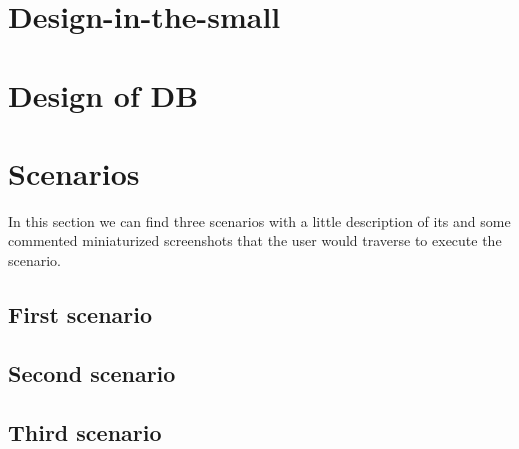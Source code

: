 \documentclass[12pt,a4paper]{article}
\begin{document}
\section{Design-in-the-small}
\section{Design of DB}
\section{Scenarios}
In this section we can find three scenarios with a little description of its and some commented miniaturized screenshots that the user would traverse to execute the scenario.
\subsection{First scenario}
\subsection{Second scenario}
\subsection{Third scenario}
\end{document}
